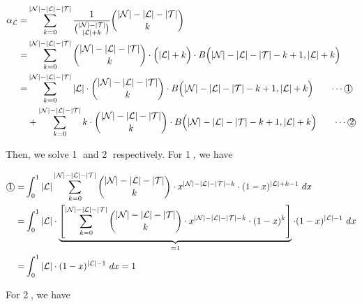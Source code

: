 \begin{small}
\begin{equation*}
\begin{aligned}
\alpha_\mathcal{L} =& \sum_{k=0}^{|\mathcal{N}|-|\mathcal{L}|-|\mathcal{T}|} \frac{1}{\binom{|\mathcal{N}|-|\mathcal{T}|}{|\mathcal{L}|+k}}\binom{|\mathcal{N}|-|\mathcal{L}|-|\mathcal{T}|}{k}\\
=& \sum_{k=0}^{|\mathcal{N}|-|\mathcal{L}|-|\mathcal{T}|}\binom{|\mathcal{N}|-|\mathcal{L}|-|\mathcal{T}|}{k}\cdot \Big(|\mathcal{L}|+k\Big)\cdot B\Big(|\mathcal{N}|-|\mathcal{L}|-|\mathcal{T}|-k+1, |\mathcal{L}|+k\Big)\\
=& \sum_{k=0}^{|\mathcal{N}|-|\mathcal{L}|-|\mathcal{T}|} |\mathcal{L}|\cdot \binom{|\mathcal{N}|-|\mathcal{L}|-|\mathcal{T}|}{k}\cdot B\Big(|\mathcal{N}|-|\mathcal{L}|-|\mathcal{T}|-k+1, |\mathcal{L}|+k\Big) \qquad\text{$\cdots$\textcircled{1}}\\
&+ \sum_{k=0}^{|\mathcal{N}|-|\mathcal{L}|-|\mathcal{T}|} k\cdot \binom{|\mathcal{N}|-|\mathcal{L}|-|\mathcal{T}|}{k}\cdot B\Big(|\mathcal{N}|-|\mathcal{L}|-|\mathcal{T}|-k+1, |\mathcal{L}|+k\Big) \qquad\text{$\cdots$\textcircled{2}}
\end{aligned}
\end{equation*}
\end{small}

Then, we solve \textcircled{1} and \textcircled{2} respectively. For \textcircled{1}, we have

\begin{small}
\begin{align*}
\text{\textcircled{1}} =& \int_0^1 |\mathcal{L}|\sum_{k=0}^{|\mathcal{N}|-|\mathcal{L}|-|\mathcal{T}|}\binom{|\mathcal{N}|-|\mathcal{L}|-|\mathcal{T}|}{k}\cdot x^{|\mathcal{N}|-|\mathcal{L}|-|\mathcal{T}|-k}\cdot (1-x)^{|\mathcal{L}|+k-1}\ dx\\
=& \int_0^1 |\mathcal{L}|\cdot\underbrace{\left[\sum_{k=0}^{|\mathcal{N}|-|\mathcal{L}|-|\mathcal{T}|}\binom{|\mathcal{N}|-|\mathcal{L}|-|\mathcal{T}|}{k}\cdot x^{|\mathcal{N}|-|\mathcal{L}|-|\mathcal{T}|-k}\cdot (1-x)^{k}\right]}_{=1}\cdot (1-x)^{|\mathcal{L}|-1}\ dx\\
=& \int_0^1 |\mathcal{L}|\cdot (1-x)^{|\mathcal{L}|-1}\ dx = 1
\end{align*}
\end{small}

For \textcircled{2}, we have


